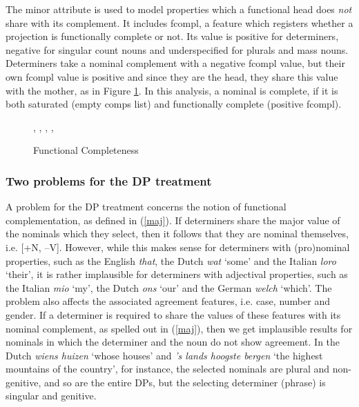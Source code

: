 \documentclass[output=paper]{langsci/langscibook}
\begin{document}
The {\sc minor} attribute is used to model properties which a functional head does {\em not\/} share with its 
complement. It includes {\sc fcompl}, a feature which registers whether a projection is 
functionally complete or not. Its value is positive for determiners, negative for  
singular count nouns and underspecified for plurals and mass nouns.  
Determiners take a nominal complement with a negative {\sc fcompl} value, but their 
own {\sc fcompl} value is positive and since they are the head, they share this value with 
the mother, as in Figure \ref{netter}. 
In this analysis, a nominal is complete, if it is both saturated 
(empty {\sc comps} list) and functionally complete (positive {\sc fcompl}). 

\begin{figure}
\begin{center}
\footnotesize
\tree
{,
  {,
    {}},
  {,
    {}}}
\caption{\label{netter} Functional Completeness }
\normalsize
\end{center}
\end{figure} 


\subsubsection{Two problems for the DP treatment}  


A problem for the DP treatment concerns the notion of 
functional complementation, as defined in (\ref{maj}). 
If determiners share the {\sc major} value of the nominals which they select, 
then it follows that they are nominal themselves, i.e. [+N, --V].
However, while this makes sense for determiners with (pro)nominal properties,
such as the English {\it that}, the Dutch {\it wat\/} `some' and the Italian 
{\it loro\/} `their', it is rather implausible for determiners with adjectival properties,
such as the Italian {\it mio\/} `my', the Dutch {\it ons\/} `our' and the German
{\it welch\/} `which'.   
The problem also affects the associated agreement features, i.e. {\sc case}, 
{\sc number} and {\sc gender}. If a determiner 
is required to share the values of these features with its nominal complement,
as spelled out in (\ref{maj}), then we get implausible results for nominals in 
which the determiner and the noun do not show agreement.    
In the Dutch {\it wiens huizen\/} `whose houses' and 
{\it 's lands hoogste bergen\/} `the highest mountains of the country', for instance,  
the selected nominals are plural and non-genitive, and so are the entire DPs, but 
the selecting determiner (phrase) is singular and genitive. 
\end{document}
